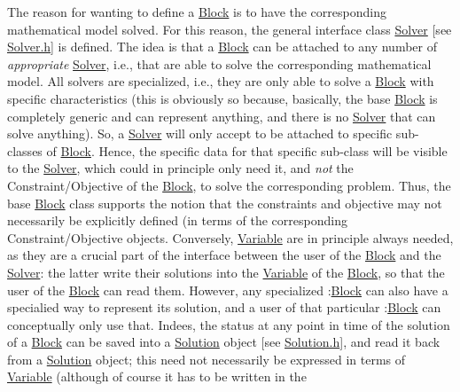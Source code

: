 The reason for wanting to define a \mbox{\hyperlink{class_s_m_spp__di__unipi__it_1_1_block}{Block}} is to have the corresponding mathematical model solved. For this reason, the general interface class \mbox{\hyperlink{class_s_m_spp__di__unipi__it_1_1_solver}{Solver}} \mbox{[}see \mbox{\hyperlink{_solver_8h}{Solver.\+h}}\mbox{]} is defined. The idea is that a \mbox{\hyperlink{class_s_m_spp__di__unipi__it_1_1_block}{Block}} can be attached to any number of {\itshape appropriate} \mbox{\hyperlink{class_s_m_spp__di__unipi__it_1_1_solver}{Solver}}, i.\+e., that are able to solve the corresponding mathematical model. All solvers are specialized, i.\+e., they are only able to solve a \mbox{\hyperlink{class_s_m_spp__di__unipi__it_1_1_block}{Block}} with specific characteristics (this is obviously so because, basically, the base \mbox{\hyperlink{class_s_m_spp__di__unipi__it_1_1_block}{Block}} is completely generic and can represent anything, and there is no \mbox{\hyperlink{class_s_m_spp__di__unipi__it_1_1_solver}{Solver}} that can solve anything). So, a \mbox{\hyperlink{class_s_m_spp__di__unipi__it_1_1_solver}{Solver}} will only accept to be attached to specific sub-\/classes of \mbox{\hyperlink{class_s_m_spp__di__unipi__it_1_1_block}{Block}}. Hence, the specific data for that specific sub-\/class will be visible to the \mbox{\hyperlink{class_s_m_spp__di__unipi__it_1_1_solver}{Solver}}, which could in principle only need it, and {\itshape not} the Constraint/\+Objective of the \mbox{\hyperlink{class_s_m_spp__di__unipi__it_1_1_block}{Block}}, to solve the corresponding problem. Thus, the base \mbox{\hyperlink{class_s_m_spp__di__unipi__it_1_1_block}{Block}} class supports the notion that the constraints and objective may not necessarily be explicitly defined (in terms of the corresponding Constraint/\+Objective objects. Conversely, \mbox{\hyperlink{class_s_m_spp__di__unipi__it_1_1_variable}{Variable}} are in principle always needed, as they are a crucial part of the interface between the user of the \mbox{\hyperlink{class_s_m_spp__di__unipi__it_1_1_block}{Block}} and the \mbox{\hyperlink{class_s_m_spp__di__unipi__it_1_1_solver}{Solver}}\+: the latter write their solutions into the \mbox{\hyperlink{class_s_m_spp__di__unipi__it_1_1_variable}{Variable}} of the \mbox{\hyperlink{class_s_m_spp__di__unipi__it_1_1_block}{Block}}, so that the user of the \mbox{\hyperlink{class_s_m_spp__di__unipi__it_1_1_block}{Block}} can read them. However, any specialized \+:\mbox{\hyperlink{class_s_m_spp__di__unipi__it_1_1_block}{Block}} can also have a specialied way to represent its solution, and a user of that particular \+:\mbox{\hyperlink{class_s_m_spp__di__unipi__it_1_1_block}{Block}} can conceptually only use that. Indees, the status at any point in time of the solution of a \mbox{\hyperlink{class_s_m_spp__di__unipi__it_1_1_block}{Block}} can be saved into a \mbox{\hyperlink{class_s_m_spp__di__unipi__it_1_1_solution}{Solution}} object \mbox{[}see \mbox{\hyperlink{_solution_8h}{Solution.\+h}}\mbox{]}, and read it back from a \mbox{\hyperlink{class_s_m_spp__di__unipi__it_1_1_solution}{Solution}} object; this need not necessarily be expressed in terms of \mbox{\hyperlink{class_s_m_spp__di__unipi__it_1_1_variable}{Variable}} (although of course it has to be written in the 